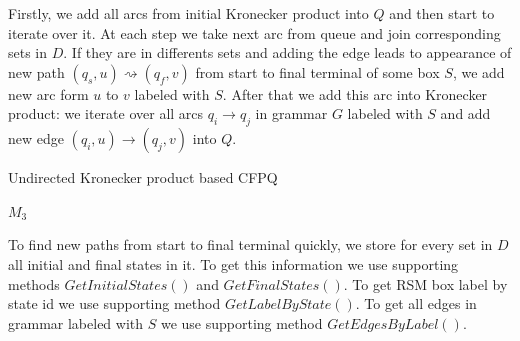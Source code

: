 Firstly, we add all arcs from initial Kronecker product into $Q$ and then start to iterate over it. At each step we take next arc from queue and join corresponding sets in $D$. If they are in differents sets and adding the edge leads to appearance of new path $(q_s, u) \rightsquigarrow (q_f, v)$ from start to final terminal of some box $S$, we add new arc form $u$ to $v$ labeled with $S$. After that we add this arc into Kronecker product: we iterate over all arcs $q_i \rightarrow q_j$ in grammar $G$ labeled with $S$ and add new edge $(q_i, u) \rightarrow (q_j, v)$ into $Q$. 

\begin{algorithm}[H]
    \begin{algorithmic}[1]
    \caption{Undirected Kronecker product based CFPQ}
    \label{alg:UndirectodTensor}
        \EndFor
                \EndIf
           \EndFor
        \EndFor
                    \EndFor
               \EndFor
            \EndFor
        \EndWhile
    \State \Return $M_3$
    \EndFunction
    \end{algorithmic}
\end{algorithm}

To find new paths from start to final terminal quickly, we store for every set in $D$ all initial and final states in it. To get this information we use supporting methods $GetInitialStates()$ and $GetFinalStates()$. To get RSM box label by state id we use supporting method $GetLabelByState()$. To get all edges in grammar labeled with $S$ we use supporting method $GetEdgesByLabel()$. 

